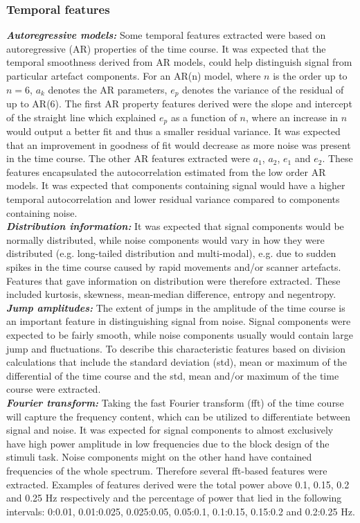 \subsubsection{Temporal features}
\textbf{\textit{Autoregressive models:}} Some temporal features extracted were based on autoregressive (AR) properties of the time course. It was expected that the temporal smoothness derived from AR models, could help distinguish signal from particular artefact components. For an AR(n) model, where $n$ is the order up to $n = 6$, $a_k$ denotes the AR parameters, $e_p$ denotes the variance of the residual of up to AR(6). The first AR property features derived were the slope and intercept of the straight line which explained $e_p$ as a function of $n$, where an increase in $n$ would output a better fit and thus a smaller residual variance. It was expected that an improvement in goodness of fit would decrease as more noise was present in the time course. 
The other AR features extracted were $a_1$, $a_2$, $e_1$ and $e_2$. These features encapsulated the autocorrelation estimated from the low order AR models. It was expected that components containing signal would have a higher temporal autocorrelation and lower residual variance compared to components containing noise. \\
\textbf{\textit{Distribution information:}} It was expected that signal components would be normally distributed, while noise components would vary in how they were distributed (e.g. long-tailed distribution and multi-modal), e.g. due to sudden spikes in the time course caused by rapid movements and/or scanner artefacts. Features that gave information on distribution were therefore extracted. These included kurtosis, skewness, mean-median difference, entropy and negentropy. \\
\textbf{\textit{Jump amplitudes:}} The extent of jumps in the amplitude of the time course is an important feature in distinguishing signal from noise. Signal components were expected to be fairly smooth, while noise components usually would contain large jump and fluctuations. To describe this characteristic features based on division calculations that include the standard deviation (std), mean or maximum of the differential of the time course and the std, mean and/or maximum of the time course were extracted. \\
\textbf{\textit{Fourier transform:}} Taking the fast Fourier transform (fft) of the time course will capture the frequency content, which can be utilized to differentiate between signal and noise. It was expected for signal components to almost exclusively have high power amplitude in low frequencies due to the block design of the stimuli task. Noise components might on the other hand have contained frequencies of the whole spectrum. Therefore several fft-based features were extracted. Examples of features derived were the total power above 0.1, 0.15, 0.2 and 0.25 Hz respectively and the percentage of power that lied in the following intervals: 0:0.01, 0.01:0.025, 0.025:0.05, 0.05:0.1, 0.1:0.15, 0.15:0.2 and 0.2:0.25 Hz. \\
